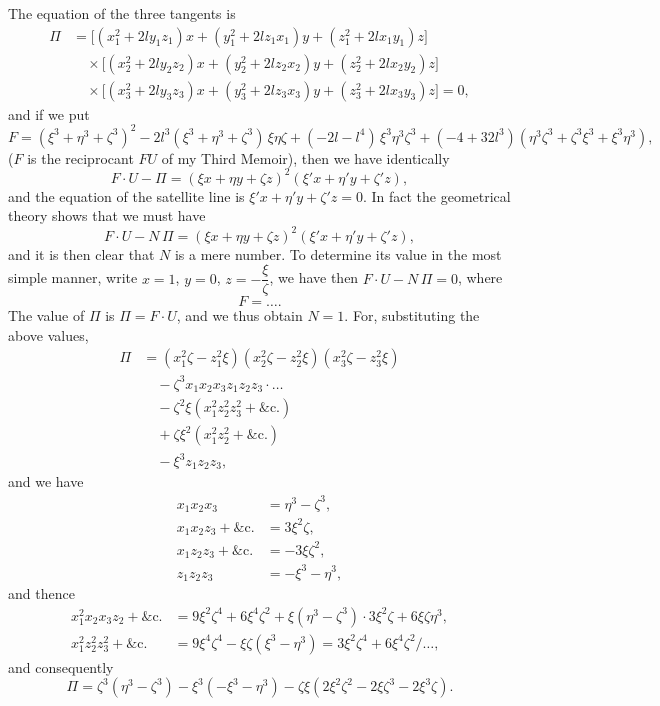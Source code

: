 \documentclass[11pt]{article}
\begin{document}
The equation of the three tangents is
\begin{align*}
\Pi &= \bigl[(x_1^2 + 2 l y_1 z_1) x + (y_1^2 + 2 l z_1 x_1) y + (z_1^2 + 2 l x_1 y_1) z\bigr] \\
    &\quad \times \bigl[(x_2^2 + 2 l y_2 z_2) x + (y_2^2 + 2 l z_2 x_2) y + (z_2^2 + 2 l x_2 y_2) z\bigr] \\
    &\quad \times \bigl[(x_3^2 + 2 l y_3 z_3) x + (y_3^2 + 2 l z_3 x_3) y + (z_3^2 + 2 l x_3 y_3) z\bigr] = 0,
\end{align*}
and if we put
\[
F = (\xi^3 + \eta^3 + \zeta^3)^2 - 2 l^3 (\xi^3 + \eta^3 + \zeta^3)\,\xi\eta\zeta + (-2 l - l^4)\,\xi^3 \eta^3 \zeta^3 + (-4 + 32 l^3)(\eta^3 \zeta^3 + \zeta^3 \xi^3 + \xi^3 \eta^3),
\]
($F$ is the reciprocant $FU$ of my Third Memoir), then we have identically
\[
F \cdot U - \Pi = (\xi x + \eta y + \zeta z)^2 (\xi' x + \eta' y + \zeta' z),
\]
and the equation of the satellite line is $\xi' x + \eta' y + \zeta' z = 0$. In fact the geometrical theory shows that we must have
\[
F \cdot U - N\,\Pi = (\xi x + \eta y + \zeta z)^2 (\xi' x + \eta' y + \zeta' z),
\]
and it is then clear that $N$ is a mere number. To determine its value in the most simple manner, write $x = 1$, $y = 0$, $z = -\dfrac{\xi}{\zeta}$, we have then $F \cdot U - N\,\Pi = 0$, where
\[
F = \ldots.
\]
The value of $\Pi$ is $\Pi = F \cdot U$, and we thus obtain $N = 1$. For, substituting the above values,
\begin{align*}
\Pi &= (x_1^2 \zeta - z_1^2 \xi)(x_2^2 \zeta - z_2^2 \xi)(x_3^2 \zeta - z_3^2 \xi) \\
    &\quad - \zeta^3 x_1 x_2 x_3 z_1 z_2 z_3 \cdot \ldots \\
    &\quad - \zeta^2 \xi(x_1^2 z_2^2 z_3^2 + \&\text{c.}) \\
    &\quad + \zeta\xi^2 (x_1^2 z_2^2 + \&\text{c.}) \\
    &\quad - \xi^3 z_1 z_2 z_3,
\end{align*}
and we have
\begin{align*}
x_1 x_2 x_3 &= \eta^3 - \zeta^3, \\
x_1 x_2 z_3 + \&\text{c.} &= 3 \xi^2 \zeta, \\
x_1 z_2 z_3 + \&\text{c.} &= -3 \xi\zeta^2, \\
z_1 z_2 z_3 &= -\xi^3 - \eta^3,
\end{align*}
and thence
\begin{align*}
x_1^2 x_2 x_3 z_2 + \&\text{c.} &= 9\xi^2 \zeta^4 + 6\xi^4 \zeta^2 + \xi(\eta^3 - \zeta^3) \cdot 3\xi^2 \zeta + 6\xi\zeta\eta^3, \\
x_1^2 z_2^2 z_3^2 + \&\text{c.} &= 9\xi^4 \zeta^4 - \xi\zeta(\xi^3 - \eta^3) = 3\xi^2 \zeta^4 + 6\xi^4 \zeta^2 / \ldots,
\end{align*}
and consequently
\[
\Pi = \zeta^3 (\eta^3 - \zeta^3) - \xi^3 (-\xi^3 - \eta^3) - \zeta\xi(2\xi^2\zeta^2 - 2\xi\zeta^3 - 2\xi^3\zeta).
\]
\end{document}
